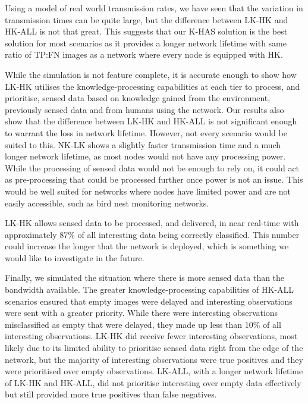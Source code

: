 Using a model of real world transmission rates, we have seen that the variation in transmission times can be quite large, but the difference between LK-HK and HK-ALL is not that great. This suggests that our K-HAS solution  is the best solution for most scenarios as it provides a longer network lifetime with same ratio of TP:FN images as a network where every node is equipped with HK.

While the simulation is not feature complete, it is accurate enough to show how LK-HK utilises the knowledge-processing capabilities at each tier to process, and prioritise, sensed data based on knowledge gained from the environment, previously sensed data and from humans using the network. Our results also show that the difference between LK-HK and HK-ALL is  not significant enough to warrant the loss in network lifetime. However, not every scenario would be suited to this. NK-LK shows a slightly faster transmission time and a much longer network lifetime, as most nodes would not have any processing power. While the processing of sensed data would not be enough to rely on, it could act as pre-processing that could be processed further once power is not an issue. This would be well suited for networks where nodes have limited power and are not easily accessible, such as bird nest monitoring networks. 

LK-HK allows sensed data to be processed, and delivered, in near real-time with approximately 87\% of all interesting data being correctly classified. This number could increase the longer that the network is deployed, which is something we would like to investigate in the future.

Finally, we simulated the situation where there is more sensed data than the bandwidth available. The greater knowledge-processing capabilities of HK-ALL scenarios ensured that empty images were delayed and interesting observations were sent with a greater priority. While there were interesting observations misclassified as empty that were delayed, they made up less than 10\% of all interesting observations. LK-HK did receive fewer interesting observations, most likely due to its limited ability to prioritise sensed data right from the edge of the network, but the majority of interesting observations were true positives and they were prioritised over empty observations. LK-ALL, with a longer network lifetime of LK-HK and HK-ALL, did not prioritise interesting over empty data effectively but still provided more true positives than false negatives.

